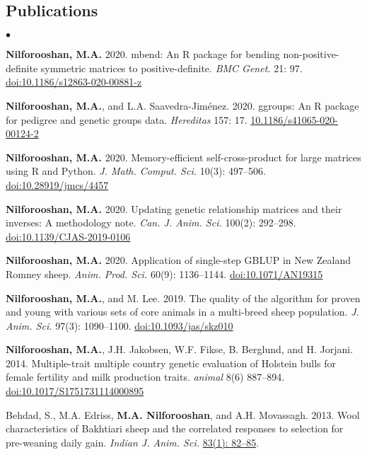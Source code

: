 \documentclass[margin,line]{res}
\newenvironment{list2}{
  \begin{list}{$\bullet$}{%
      \setlength{\itemsep}{0in}
      \setlength{\parsep}{0in} \setlength{\parskip}{0in}
      \setlength{\topsep}{0in} \setlength{\partopsep}{0in}
      \setlength{\leftmargin}{0.2in}}}{\end{list}}
\begin{document}
\begin{resume}
\section{\sc Publications}

\begin{list2}
\item {\bf Nilforooshan, M.A.} 2020. mbend: An R package for bending non-positive-deﬁnite symmetric matrices to positive-deﬁnite. {\em BMC Genet.} 21: 97. \href{https://doi.org/10.1186/s12863-020-00881-z}{doi:10.1186/s12863-020-00881-z}
\item {\bf Nilforooshan, M.A.}, and L.A. Saavedra-Jim\'{e}nez. 2020. ggroups: An R package for pedigree and genetic groups data. {\em Hereditas} 157: 17. \href{https://doi.org/10.1186/s41065-020-00124-2}{10.1186/s41065-020-00124-2}
\item {\bf Nilforooshan, M.A.} 2020. Memory-efficient self-cross-product for large matrices using R and Python. {\em J. Math. Comput. Sci.} 10(3): 497--506. \href{https://doi.org/10.28919/jmcs/4457}{doi:10.28919/jmcs/4457}
\item {\bf Nilforooshan, M.A.} 2020. Updating genetic relationship matrices and their inverses: A methodology note. {\em Can. J. Anim. Sci.} 100(2): 292--298. \href{https://doi.org/10.1139/CJAS-2019-0106}{doi:10.1139/CJAS-2019-0106}
\item {\bf Nilforooshan, M.A.} 2020. Application of single-step GBLUP in New Zealand Romney sheep. {\em Anim. Prod. Sci.} 60(9): 1136--1144. \href{https://doi.org/10.1071/AN19315}{doi:10.1071/AN19315}
\item {\bf Nilforooshan, M.A.}, and M. Lee. 2019. The quality of the algorithm for proven and young with various sets of core animals in a multi-breed sheep population. {\em J. Anim. Sci.} 97(3): 1090--1100. \href{https://doi.org/10.1093/jas/skz010}{doi:10.1093/jas/skz010}
\item {\bf Nilforooshan, M.A.}, J.H. Jakobsen, W.F. Fikse, B. Berglund, and H. Jorjani. 2014. Multiple-trait multiple country genetic evaluation of Holstein bulls for female fertility and milk production traits. {\em animal} 8(6) 887--894. \href{https://doi.org/10.1017/S1751731114000895}{doi:10.1017/S1751731114000895}
\item Behdad, S., M.A. Edriss, {\bf M.A. Nilforooshan}, and A.H. Movassagh. 2013. Wool characteristics of Bakhtiari sheep and the correlated responses to selection for pre-weaning daily gain. {\em Indian J. Anim. Sci.} \href{http://epubs.icar.org.in/ejournal/index.php/IJAnS/article/view/26453}{83(1): 82--85}.

\end{list2}
\end{resume}
\end{document}
